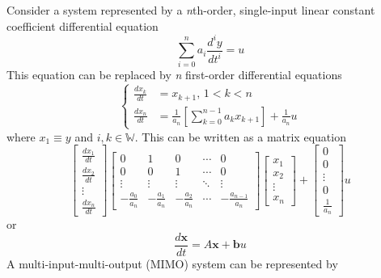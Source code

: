 \documentclass[11pt]{book}
\begin{document}
Consider a system represented by a \emph{n}th-order, single-input linear constant coefficient differential equation
\begin{equation}
	\sum_{i=0}^n{a_i\frac{d^iy}{dt^i}}=u
\end{equation}
This equation can be replaced by \emph{n} first-order differential equations
\begin{equation}
	\left\{
		\begin{aligned}
			\frac{dx_k}{dt}&=x_{k+1},\,1<k<n\\
			\frac{dx_n}{dt}&=\frac{1}{a_n}\left[\sum_{k=0}^{n-1}{a_kx_{k+1}}\right]+\frac{1}{a_n}u
		\end{aligned}
	\right.
\end{equation}
where $x_1\equiv{y}$ and $i,k\in\mathbb{W}$. This can be written as a matrix equation
\begin{equation}
	\begin{bmatrix}
		\frac{dx_1}{dt}\\
		\frac{dx_2}{dt}\\
		\vdots\\
		\frac{dx_n}{dt}
	\end{bmatrix}
	\begin{bmatrix}
		0&1&0&\cdots&0\\
		0&0&1&\cdots&0\\
		\vdots&\vdots&\vdots&\ddots&\vdots\\
		-\frac{a_0}{a_n}&-\frac{a_1}{a_n}&-\frac{a_2}{a_n}&\cdots&-\frac{a_{n-1}}{a_n}
	\end{bmatrix}
	\begin{bmatrix}
		x_1\\
		x_2\\
		\vdots\\
		x_n
	\end{bmatrix}+
	\begin{bmatrix}
		0\\
		0\\
		\vdots\\
		0\\
		\frac{1}{a_n}
	\end{bmatrix}u
\end{equation}
or
\begin{equation}
	\frac{d\mathbf{x}}{dt}=A\mathbf{x}+\mathbf{b}u
\end{equation}
A multi-input-multi-output (MIMO) system can be represented by
\end{document}
